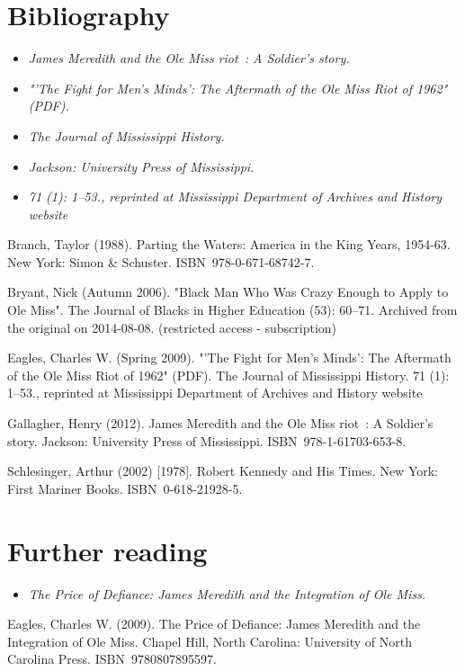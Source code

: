 \section{Bibliography}\label{bibliography}

\begin{itemize}
\item
  \emph{James Meredith and the Ole Miss riot~: A Soldier's story.}
\item
  \emph{"'The Fight for Men's Minds': The Aftermath of the Ole Miss Riot
  of 1962" (PDF).}
\item
  \emph{The Journal of Mississippi History.}
\item
  \emph{Jackson: University Press of Mississippi.}
\item
  \emph{71 (1): 1--53., reprinted at Mississippi Department of Archives
  and History website}
\end{itemize}

Branch, Taylor (1988). Parting the Waters: America in the King Years,
1954-63. New York: Simon \& Schuster. ISBN~978-0-671-68742-7.

Bryant, Nick (Autumn 2006). "Black Man Who Was Crazy Enough to Apply to
Ole Miss". The Journal of Blacks in Higher Education (53): 60--71.
Archived from the original on 2014-08-08. (restricted access -
subscription)

Eagles, Charles W. (Spring 2009). "'The Fight for Men's Minds': The
Aftermath of the Ole Miss Riot of 1962" (PDF). The Journal of
Mississippi History. 71 (1): 1--53., reprinted at Mississippi Department
of Archives and History website

Gallagher, Henry (2012). James Meredith and the Ole Miss riot~: A
Soldier's story. Jackson: University Press of Mississippi.
ISBN~978-1-61703-653-8.

Schlesinger, Arthur (2002) {[}1978{]}. Robert Kennedy and His Times. New
York: First Mariner Books. ISBN~0-618-21928-5.

\section{Further reading}\label{further-reading}

\begin{itemize}
\item
  \emph{The Price of Defiance: James Meredith and the Integration of Ole
  Miss.}
\end{itemize}

Eagles, Charles W. (2009). The Price of Defiance: James Meredith and the
Integration of Ole Miss. Chapel Hill, North Carolina: University of
North Carolina Press. ISBN~9780807895597.

